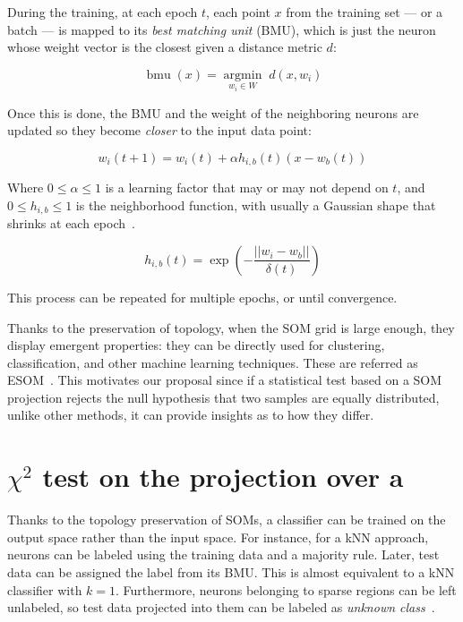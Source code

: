 During the training, at each epoch $t$, each point $x$ from the training set
--- or a batch --- is mapped to its \emph{best matching unit} (BMU), which is
just the neuron whose weight vector is the closest given a distance metric $d$:

\begin{equation}
    \operatorname{bmu}(x) = \underset{w_i \in W}{\operatorname{argmin}} \; d(x, w_i)
\end{equation}

Once this is done, the BMU and the weight of the neighboring neurons are updated so they become
\emph{closer} to the input data point:

\begin{equation}
    w_i(t + 1) = w_i(t) + \alpha h_{i,b}(t) (x - w_b(t))
\end{equation}

Where $0 \le \alpha \le 1$ is a learning factor that may or may not depend on $t$,
and $0 \le h_{i,b} \le 1$ is the neighborhood function, with usually a Gaussian shape
that shrinks at each epoch~\cite{Villmann1999,wittek2013somoclu}.

\begin{equation}
    h_{i,b}(t) = \exp(- \frac{||w_i - w_b||}{\delta(t)})
\end{equation}

This process can be repeated for multiple epochs, or until convergence.

\medskip

Thanks to the preservation of topology, when the \gls{SOM}  grid is large enough,
they display emergent properties: they can be directly used for clustering,
classification, and other machine learning techniques. These are referred as
\gls{ESOM}~\cite{ultsch2005esom}.
This motivates our proposal since if a statistical test based on a \gls{SOM}
projection rejects the null hypothesis that two samples are equally distributed,
unlike other methods, it can provide insights as to how they differ.

\section{\texorpdfstring{$\chi^2$}{χ²} test on the projection over a }
\label{sec:som_chi2}

Thanks to the topology preservation of \glspl{SOM}, a classifier can be trained
on the output space rather than the input space. For instance, for a \gls{kNN}
approach, neurons can be labeled using the training data and a majority rule. Later, test data
can be assigned the label from its BMU. This is almost equivalent to a \gls{kNN} classifier with $k=1$.
Furthermore, neurons belonging to sparse regions can be left unlabeled, so test data projected
into them can be labeled as \emph{unknown class}~\cite{ultsch2005esom,silva2011som}.

